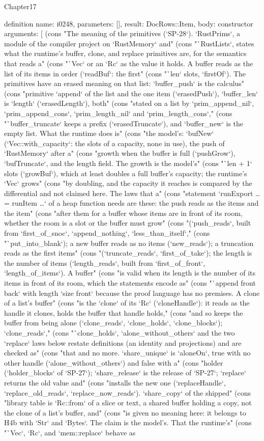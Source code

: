 \begin{lexlean}{Chapter17}
\begin{semanticmodule}
definition{
  name: i0248,
  parameters: [],
  result: DocRows::Item,
  body: constructor{
    arguments: [
      (cons "The meaning of the primitives (`SP-28`). `RustPrims`, a module of the compiler project on `RustMemory` and" (cons "`RustLists`, states what the runtime's buffer, clone, and replace primitives are, for the semantics that reads a" (cons "`Vec` or an `Rc` as the value it holds. A buffer reads as the list of its items in order (`readBuf`: the first" (cons "`len` slots, `firstOf`). The primitives have an erased meaning on that list: `buffer_push` is the calculus" (cons "primitive `append` of the list and the one item (`erasedPush`), `buffer_len` is `length` (`erasedLength`), both" (cons "stated on a list by `prim_append_nil`, `prim_append_cons`, `prim_length_nil` and `prim_length_cons`," (cons "`buffer_truncate` keeps a prefix (`erasedTruncate`), and `buffer_new` is the empty list. What the runtime does is" (cons "the model's: `bufNew` (`Vec::with_capacity`: the slots of a capacity, none in use), the push of `RustMemory` after a" (cons "growth when the buffer is full (`pushGrow`), `bufTruncate`, and the length field. The growth is the model's" (cons "`len + 1` slots (`growBuf`), which at least doubles a full buffer's capacity; the runtime's `Vec` grows" (cons "by doubling, and the capacity it reaches is compared by the differential and not claimed here. The laws that a" (cons "statement `runExport … = runItem …` of a heap function needs are these: the push reads as the items and the item" (cons "after them for a buffer whose items are in front of its room, whether the room is a slot or the buffer must grow" (cons "(`push_reads`, built from `first_of_snoc`, `append_nothing`, `less_than_itself`," (cons "`put_into_blank`); a new buffer reads as no items (`new_reads`); a truncation reads as the first items" (cons "(`truncate_reads`, `first_of_take`); the length is the number of items (`length_reads`, built from `first_of_front`, `length_of_items`). A buffer" (cons "is valid when its length is the number of its items in front of its room, which the statements encode as" (cons "`append front back` with length `size front` because the proof language has no premises. A clone of a list's buffer" (cons "is the `clone` of its `Rc` (`cloneHandle`): it reads as the handle it clones, holds the buffer that handle holds," (cons "and so keeps the buffer from being alone (`clone_reads`, `clone_holds`, `clone_blocks`); `clone_reads`," (cons "`clone_holds`, `alone_without_others` and the two `replace` laws below restate definitions (an identity and projections) and are checked as" (cons "that and no more. `share_unique` is `aloneOn`, true with no other handle (`alone_without_others`) and false with a" (cons "holder (`holder_blocks` of `SP-27`); `share_release` is the release of `SP-27`; `replace` returns the old value and" (cons "installs the new one (`replaceHandle`, `replace_old_reads`, `replace_now_reads`). `share_copy` of the shipped" (cons "library table is `Rc::from` of a slice or text, a shared buffer holding a copy, not the clone of a list's buffer, and" (cons "is given no meaning here: it belongs to H4b with `Str` and `Bytes`. The claim is the model's. That the runtime's" (cons "`Vec`, `Rc`, and `mem::replace` behave as }}
\end{semanticmodule}
\end{lexlean}
